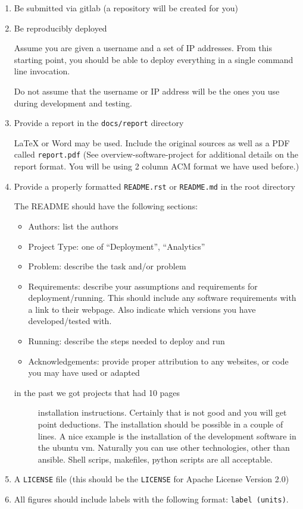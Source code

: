 \begin{enumerate}
\item
  Be submitted via gitlab (a repository will be created for you)
\item
  Be reproducibly deployed

  Assume you are given a username and a set of IP addresses. From this
  starting point, you should be able to deploy everything in a single
  command line invocation.

  Do not assume that the username or IP address will be the ones you use
  during development and testing.
\item
  Provide a report in the \texttt{docs/report} directory

  LaTeX or Word may be used. Include the original sources as well as a
  PDF called \texttt{report.pdf} (See overview-software-project for
  additional details on the report format. You will be using 2 column
  ACM format we have used before.)
\item
  Provide a properly formatted \texttt{README.rst} or \texttt{README.md}
  in the root directory

  The README should have the following sections:

  \begin{itemize}
  \tightlist
  \item
    Authors: list the authors
  \item
    Project Type: one of ``Deployment'', ``Analytics''
  \item
    Problem: describe the task and/or problem
  \item
    Requirements: describe your assumptions and requirements for
    deployment/running. This should include any software requirements
    with a link to their webpage. Also indicate which versions you have
    developed/tested with.
  \item
    Running: describe the steps needed to deploy and run
  \item
    Acknowledgements: provide proper attribution to any websites, or
    code you may have used or adapted
  \end{itemize}

  \begin{description}
  \item[in the past we got projects that had 10 pages]
  installation instructions. Certainly that is not good and you will get
  point deductions. The installation should be possible in a couple of
  lines. A nice example is the installation of the development software
  in the ubuntu vm. Naturally you can use other technologies, other than
  ansible. Shell scrips, makefiles, python scripts are all acceptable.
  \end{description}
\item
  A \texttt{LICENSE} file (this should be the \texttt{LICENSE} for
  Apache License Version 2.0)
\item
  All figures should include labels with the following format:
  \texttt{label\ (units)}.


\end{enumerate}
